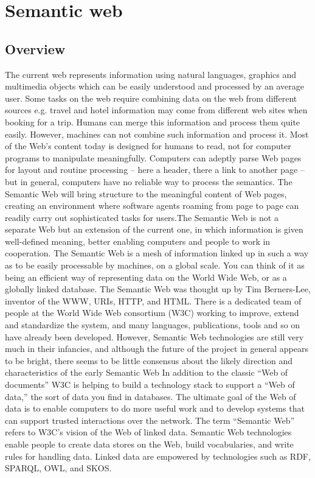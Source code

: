 \documentclass[a4paper,12pt,oneside]{report}
\begin{document}
{{\section{Semantic web}
\subsection{Overview}
{       The current web represents information using natural languages, graphics and multimedia objects which can be easily understood and processed by an average user. Some tasks on the web require combining data on the web from different sources e.g. travel and hotel information may come from different web sites when booking for a trip. Humans can merge this information and process them quite easily. However, machines can not combine such information and process it. Most of the Web’s content today is designed for humans to read, not for computer programs to manipulate meaningfully. Computers can adeptly parse Web pages for layout and routine processing – here a header, there a link to another page – but in general, computers have no reliable way to process the semantics.
The Semantic Web will bring structure to the meaningful content of Web pages, creating an environment where software agents roaming from page to page can readily carry out sophisticated tasks for users.The Semantic Web is not a separate Web but an extension of the current one, in which information is given well-defined meaning, better enabling computers and people to work in cooperation.
The Semantic Web is a mesh of information linked up in such a way as to be easily processable by machines, on a global scale. You can think of it as being an efficient way of representing data on the World Wide Web, or as a globally linked database.
The Semantic Web was thought up by Tim Berners-Lee, inventor of the WWW, URIs, HTTP, and HTML. There is a dedicated team of people at the World Wide Web consortium (W3C) working to improve, extend and standardize the system, and many languages, publications, tools and so on have already been developed. However, Semantic Web technologies are still very much in their infancies, and although the future of the project in general appears to be bright, there seems to be little consensus about the likely direction and characteristics of the early Semantic Web
      In addition to the classic “Web of documents” W3C is helping to build a technology stack to support a “Web of data,” the sort of data you find in databases. The ultimate goal of the Web of data is to enable computers to do more useful work and to develop systems that can support trusted interactions over the network. The term “Semantic Web” refers to W3C’s vision of the Web of linked data. Semantic Web technologies enable people to create data stores on the Web, build vocabularies, and write rules for handling data. Linked data are empowered by technologies such as RDF, SPARQL, OWL, and SKOS.}
}}
\end{document}
